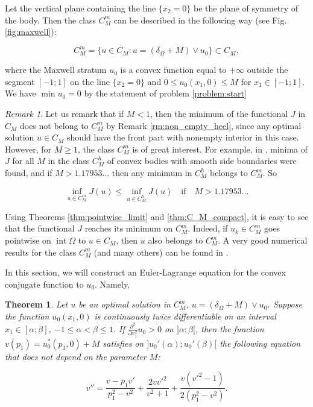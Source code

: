 \documentclass[14pt]{extarticle}
\renewcommand{\le}{\leqslant}
\renewcommand{\ge}{\geqslant}
\DeclareMathOperator{\Int}{\mathrm{int}}
\newtheorem{thm}{Theorem}
\theoremstyle{remark}
\newtheorem{remark}{Remark}
\theoremstyle{definition}
\begin{document}
Let the vertical plane containing the line $\{x_2=0\}$ be the plane of symmetry of the body. Then the class $C_M^m$ can be described in the following way (see Fig. \ref{fig:maxwell}):

\[
	C_M^m = \{u\in C_M: u = (\delta_\Omega + M)\vee u_0\}\subset C_M,
\]

\noindent where the Maxwell stratum $u_0$ is a convex function equal to $+\infty$ outside the segment $[-1;1]$ on the line $\{x_2=0\}$ and $0\le u_0(x_1,0)\le M$ for $x_1\in[-1;1]$. We have $\min u_0=0$ by the statement of problem \eqref{problem:start} 

\begin{remark}
	Let us remark that if $M<1$, then the minimum of the functional $J$ in $C_M$ does not belong to $C_M^m$ by Remark \ref{rm:non_empty_heel}, since any optimal solution $u\in C_M$ should have the front part with nonempty interior in this case. However, for $M\ge1$, the class $C_M^m$ is of great interest. For example, in \cite{LachandPolygon}, minima of $J$ for all $M$ in the class $C_M^h$ of convex bodies with smooth side boundaries were found, and if $M>1.17953\ldots$ then any minimum in $C_M^h$ belongs to $C_M^m$. So
	
	\[
		\inf_{u\in C_M^m} J(u) \le \inf_{u\in C_M^h} J(u)
		\quad\mbox{if}\quad
		M>1.17953\ldots
	\]

\end{remark}

Using Theorems \ref{thm:pointwise_limit} and \ref{thm:C_M_compact}, it is easy to see that the functional $J$ reaches its minimum on $C_M^m$. Indeed, if $u_k\in C_M^m$ goes pointwise on $\Int\Omega$ to $u\in C_M$, then $u$ also belongs to $C_M^m$. A very good numerical results for the class $C_M^m$ (and many others) can be found in \cite{Wachsmuth}.

In this section, we will construct  an Euler-Lagrange equation for the convex conjugate function to $u_0$. Namely,

\begin{thm}
\label{thm:maxwell}
	Let $u$ be an optimal solution in $C_M^m$, $u=(\delta_\Omega+M)\vee u_0$. Suppose the function $u_0(x_1,0)$ is continuously twice differentiable on an interval $x_1\in[\alpha;\beta]$, $-1\le\alpha<\beta\le1$. If $\frac{\partial^2}{\partial x_1^2}u_0>0$ on $]\alpha;\beta[$, then the function $v(p_1)=u_0^*(p_1,0)+M$ satisfies on $]u_0'(\alpha);u_0'(\beta)[$ the following equation that does not depend on the parameter $M$:
	
	\[
		v'' = \frac{v-p_1 v'}{p_1^2-v^2}+
		\frac{2 v v'^2}{v^2+1}+\frac{v (v'^2-1)}{2 (p_1^2-v^2)}.
	\]
\end{thm}
\end{document}
